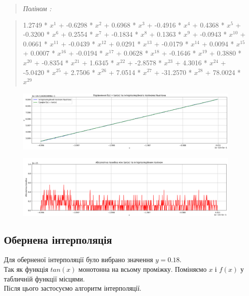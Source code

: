 \documentclass[a4paper, 12pt]{article}
\begin{document}
\begin{quote}
\textit{Поліном :} 
\end{quote}

\begin{quote}
1.2749 * \( x^1 \) + -0.6298 * \( x^2 \) + 0.6968 * \( x^3 \) + -0.4916 * \( x^4 \) + 0.4368 * \( x^5 \) + -0.3200 * \( x^6 \) + 0.2554 * \( x^7 \) + -0.1834 * \( x^8 \) + 0.1363 * \( x^9 \) + -0.0943 * \( x^{10} \) + 0.0661 * \( x^{11} \) + -0.0439 * \( x^{12} \) + 0.0291 * \( x^{13} \) + -0.0179 * \( x^{14} \) + 0.0094 * \( x^{15} \) + 0.0007 * \( x^{16} \) + -0.0194 * \( x^{17} \) + 0.0628 * \( x^{18} \) + -0.1646 * \( x^{19} \) + 0.3880 * \( x^{20} \) + -0.8354 * \( x^{21} \) + 1.6345 * \( x^{22} \) + -2.8578 * \( x^{23} \) + 4.3016 * \( x^{24} \) + -5.0420 * \( x^{25} \) + 2.7506 * \( x^{26} \) + 7.0514 * \( x^{27} \) + -31.2570 * \( x^{28} \) + 78.0024 * \( x^{29} \)
\end{quote}

\newpage
\begin{figure}[ht]
	\centering
	\includegraphics[width=1\linewidth]{./img/program1_out.png}
\end{figure}

\begin{figure}[ht]
	\centering
	\includegraphics[width=1\linewidth]{./img/program1_out_err.png}
\end{figure}


\newpage
\subsection{Обернена інтерполяція}

Для оберненої інтерполяції було вибрано значення \( y = 0.18 \). \\
Так як функція \(tan(x)\) монотонна на всьому проміжку. Поміняємо \(x\) і \(f(x)\) у табличній функції місцями. \\
Після цього застосуємо алгоритм інтерполяції. \\
\end{document}
